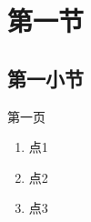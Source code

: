 
\section{第一节}

\subsection{第一小节}

\begin{frame}{第一页}
  \begin{enumerate}
    \item 点1
    \item 点2
    \item 点3
  \end{enumerate}
\end{frame}